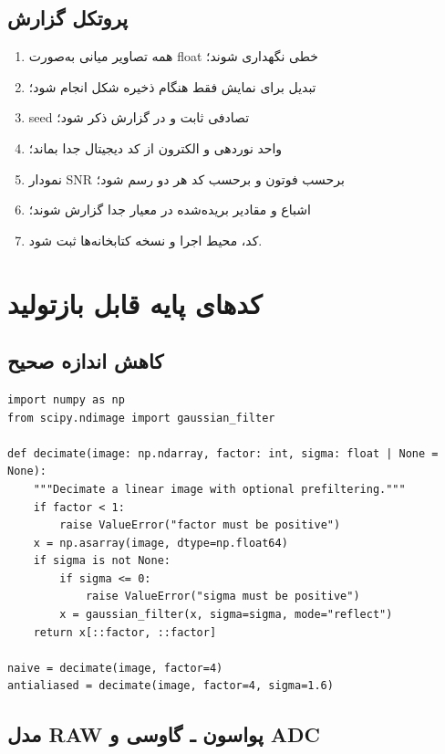 \subsection{پروتکل گزارش}

\begin{enumerate}
\item همه تصاویر میانی به‌صورت float خطی نگهداری شوند؛
\item تبدیل برای نمایش فقط هنگام ذخیره شکل انجام شود؛
\item seed تصادفی ثابت و در گزارش ذکر شود؛
\item واحد نوردهی و الکترون از کد دیجیتال جدا بماند؛
\item نمودار SNR برحسب فوتون و برحسب کد هر دو رسم شود؛
\item اشباع و مقادیر بریده‌شده در معیار جدا گزارش شوند؛
\item کد، محیط اجرا و نسخه کتابخانه‌ها ثبت شود.
\end{enumerate}

\section{کدهای پایه قابل بازتولید}

\subsection{کاهش اندازه صحیح}

\begin{LTR}
\begin{lstlisting}
import numpy as np
from scipy.ndimage import gaussian_filter

def decimate(image: np.ndarray, factor: int, sigma: float | None = None):
    """Decimate a linear image with optional prefiltering."""
    if factor < 1:
        raise ValueError("factor must be positive")
    x = np.asarray(image, dtype=np.float64)
    if sigma is not None:
        if sigma <= 0:
            raise ValueError("sigma must be positive")
        x = gaussian_filter(x, sigma=sigma, mode="reflect")
    return x[::factor, ::factor]

naive = decimate(image, factor=4)
antialiased = decimate(image, factor=4, sigma=1.6)
\end{lstlisting}
\end{LTR}

\subsection{مدل RAW پواسون ـ گاوسی و ADC}

